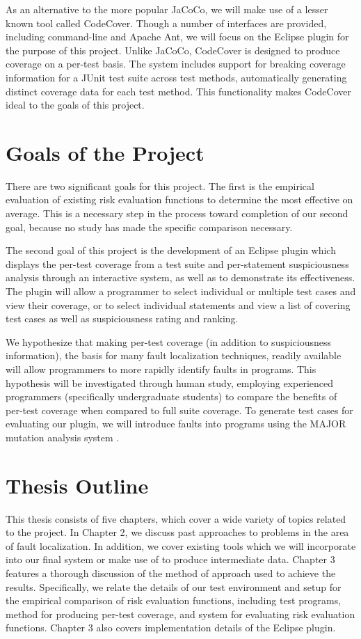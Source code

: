 As an alternative to the more popular JaCoCo, we will make use of a
lesser known tool called CodeCover.  Though a number of interfaces are
provided, including command-line and Apache Ant, we will focus on the
Eclipse plugin for the purpose of this project.  Unlike JaCoCo,
CodeCover is designed to produce coverage on a per-test basis.  The
system includes support for breaking coverage information for a JUnit 
test suite across test methods, automatically generating
distinct coverage data for each test method.  This functionality
makes CodeCover ideal to the goals of this project.

\section{Goals of the Project}\label{sec:goals}
There are two significant goals for this project.  The first is the
empirical evaluation of existing risk evaluation functions to 
determine the most effective on average.  This is a necessary step
in the process toward completion of our second goal, because no
study has made the specific comparison necessary.

The second goal of this project is the development of an Eclipse plugin
which displays the per-test coverage from a test suite and per-statement
suspiciousness analysis through an interactive system, as well as to
demonstrate its effectiveness.  The plugin will allow a programmer to
select individual or multiple test cases and view their coverage, or
to select individual statements and view a list of covering test cases
as well as suspiciousness rating and ranking. 

We hypothesize that making per-test coverage (in addition to suspiciousness
information), the basis for many fault
localization techniques, readily available will allow programmers to
more rapidly identify faults in programs.  This hypothesis will be
investigated through human study, employing experienced programmers
(specifically undergraduate students) to compare
the benefits of per-test coverage when compared to full suite coverage.
To generate test cases for evaluating our plugin, we will introduce
faults into programs using the MAJOR mutation analysis system
\cite{major}.

\section{Thesis Outline}\label{sec:outline}
This thesis consists of five chapters, which cover a wide variety of
topics related to the project.  In Chapter 2, we discuss past approaches
to problems in the area of fault localization.  In addition, we cover
existing tools which we will incorporate into our final system or make
use of to produce intermediate data.  Chapter 3 features a thorough
discussion of the method of approach used to achieve the results.  Specifically,
we relate the details of our test environment and setup for the empirical
comparison of risk evaluation functions, including test programs, method for
producing per-test coverage, and system for evaluating risk evaluation functions.
Chapter 3 also covers implementation details of the Eclipse plugin.


